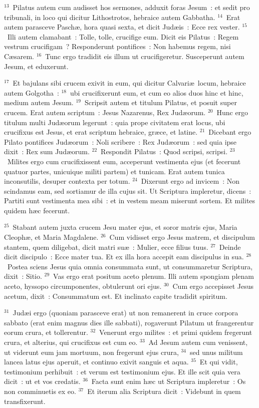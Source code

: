 ${}^{13}$~Pilatus autem cum audisset hos sermones, adduxit foras Jesum~: et sedit pro tribunali, in loco qui dicitur Lithostrotos, hebraice autem Gabbatha.
${}^{14}$~Erat autem parasceve Pasch\ae , hora quasi sexta, et dicit Jud\ae is~: Ecce rex vester.
${}^{15}$~Illi autem clamabant~: Tolle, tolle, crucifige eum. Dicit eis Pilatus~: Regem vestrum crucifigam~? Responderunt pontifices~: Non habemus regem, nisi C\ae sarem.
${}^{16}$~Tunc ergo tradidit eis illum ut crucifigeretur. Susceperunt autem Jesum, et eduxerunt.


${}^{17}$~Et bajulans sibi crucem exivit in eum, qui dicitur Calvari\ae\ locum, hebraice autem Golgotha~:
${}^{18}$~ubi crucifixerunt eum, et cum eo alios duos hinc et hinc, medium autem Jesum.
${}^{19}$~Scripsit autem et titulum Pilatus, et posuit super crucem. Erat autem scriptum~: Jesus Nazarenus, Rex Jud\ae orum.
${}^{20}$~Hunc ergo titulum multi Jud\ae orum legerunt~: quia prope civitatem erat locus, ubi crucifixus est Jesus, et erat scriptum hebraice, gr\ae ce, et latine.
${}^{21}$~Dicebant ergo Pilato pontifices Jud\ae orum~: Noli scribere~: Rex Jud\ae orum~: sed quia ipse dixit~: Rex sum Jud\ae orum.
${}^{22}$~Respondit Pilatus~: Quod scripsi, scripsi.
${}^{23}$~Milites ergo cum crucifixissent eum, acceperunt vestimenta ejus (et fecerunt quatuor partes, unicuique militi partem) et tunicam. Erat autem tunica inconsutilis, desuper contexta per totum.
${}^{24}$~Dixerunt ergo ad invicem~: Non scindamus eam, sed sortiamur de illa cujus sit. Ut Scriptura impleretur, dicens~: Partiti sunt vestimenta mea sibi~: et in vestem meam miserunt sortem. Et milites quidem h\ae c fecerunt.


${}^{25}$~Stabant autem juxta crucem Jesu mater ejus, et soror matris ejus, Maria Cleoph\ae , et Maria Magdalene.
${}^{26}$~Cum vidisset ergo Jesus matrem, et discipulum stantem, quem diligebat, dicit matri su\ae~: Mulier, ecce filius tuus.
${}^{27}$~Deinde dicit discipulo~: Ecce mater tua. Et ex illa hora accepit eam discipulus in sua.
${}^{28}$~Postea sciens Jesus quia omnia consummata sunt, ut consummaretur Scriptura, dixit~: Sitio.
${}^{29}$~Vas ergo erat positum aceto plenum. Illi autem spongiam plenam aceto, hyssopo circumponentes, obtulerunt ori ejus.
${}^{30}$~Cum ergo accepisset Jesus acetum, dixit~: Consummatum est. Et inclinato capite tradidit spiritum.


${}^{31}$~Jud\ae i ergo (quoniam parasceve erat) ut non remanerent in cruce corpora sabbato (erat enim magnus dies ille sabbati), rogaverunt Pilatum ut frangerentur eorum crura, et tollerentur.
${}^{32}$~Venerunt ergo milites~: et primi quidem fregerunt crura, et alterius, qui crucifixus est cum eo.
${}^{33}$~Ad Jesum autem cum venissent, ut viderunt eum jam mortuum, non fregerunt ejus crura,
${}^{34}$~sed unus militum lancea latus ejus aperuit, et continuo exivit sanguis et aqua.
${}^{35}$~Et qui vidit, testimonium perhibuit~: et verum est testimonium ejus. Et ille scit quia vera dicit~: ut et vos credatis.
${}^{36}$~Facta sunt enim h\ae c ut Scriptura impleretur~: Os non comminuetis ex eo.
${}^{37}$~Et iterum alia Scriptura dicit~: Videbunt in quem transfixerunt.


